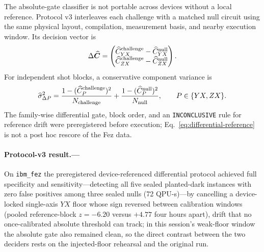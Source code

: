 \documentclass[aps,prl,reprint,superscriptaddress,nofootinbib]{revtex4-2}
\begin{document}
The absolute-gate classifier is not portable across devices without a local reference.  Protocol v3 interleaves each challenge with a matched null circuit using the same physical layout, compilation, measurement basis, and nearby execution window.  Its decision vector is
\begin{equation}
 \Delta\widehat{\bm C}=
 \begin{pmatrix}
 \widehat C_{YX}^{\rm challenge}-\widehat C_{YX}^{\rm null}\\
 \widehat C_{ZX}^{\rm challenge}-\widehat C_{ZX}^{\rm null}
 \end{pmatrix}.
 \label{eq:differential-reference}
\end{equation}
For independent shot blocks, a conservative component variance is
\begin{equation}
 \widehat\sigma_{\Delta P}^2=
 \frac{1-(\widehat C_P^{\rm challenge})^2}{N_{\rm challenge}}
 +\frac{1-(\widehat C_P^{\rm null})^2}{N_{\rm null}},
 \qquad P\in\{YX,ZX\}.
 \label{eq:differential-variance}
\end{equation}
The family-wise differential gate, block order, and an \texttt{INCONCLUSIVE} rule for reference drift were preregistered before execution; Eq.~\eqref{eq:differential-reference} is not a post hoc rescore of the Fez data.

\paragraph{Protocol-v3 result.---}
On \texttt{ibm\_fez} the preregistered device-referenced differential protocol achieved full specificity and sensitivity---detecting all five sealed planted-dark instances with zero false positives among three sealed nulls (72 QPU-s)---by cancelling a device-locked single-axis $YX$ floor whose sign reversed between calibration windows (pooled reference-block $z=-6.20$ versus $+4.77$ four hours apart), drift that no once-calibrated absolute threshold can track; in this session's weak-floor window the absolute gate also remained clean, so the direct contrast between the two deciders rests on the injected-floor rehearsal and the original run.
\end{document}
